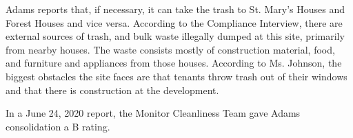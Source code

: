 Adams reports that, if necessary, it can take the trash to St. Mary's Houses and Forest Houses and vice versa. According to the Compliance Interview, there are external sources of trash, and bulk waste illegally dumped at this site, primarily from nearby houses. The waste consists mostly of construction material, food, and furniture and appliances from those houses. According to Ms. Johnson, the biggest obstacles the site faces are that tenants throw trash out of their windows and that there is construction at the development.

In a June 24, 2020 report, the Monitor Cleanliness Team gave Adams consolidation a B rating. 